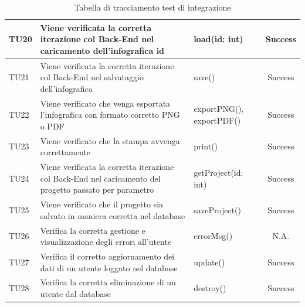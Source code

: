 \begin{table}[h]
\begin{center}
\begin{tabular}{|l|p{}|p{}|c|}
		TU20 & Viene verificata la corretta iterazione col Back-End nel caricamento dell'infografica \textbf{id} & load(id: int) & Success\\
	\midrule
		TU21 & Viene verificata la corretta iterazione col Back-End nel salvataggio dell'infografica & save() & Success\\
	\midrule
		TU22 & Viene verificato che venga esportata l'infografica con formato corretto PNG o PDF &  exportPNG(), exportPDF() & Success\\
	\midrule
		TU23 & Viene verificato che la stampa avvenga correttamente &  print() & Success\\
	\midrule
		TU24 & Viene verificata la corretta iterazione col Back-End nel caricamento del progetto passato per parametro & getProject(id: int) & Success\\
	\midrule
		TU25 & Viene verificato che il progetto sia salvato in maniera corretta nel database &  saveProject() & Success\\
	\midrule
		TU26 & Verifica la corretta gestione e visualizzazione degli errori all'utente &  errorMsg() & N.A.\\
	\midrule
		TU27 & Verifica il corretto aggiornamento dei dati di un utente loggato nel database &  update() & Success\\
	\midrule
		TU28 & Verifica la corretta eliminazione di un utente dal database &  destroy() & Success\\
	\bottomrule
	\end{tabular}
	\end{center}
	\caption{Tabella di tracciamento test di integrazione}
\end{table}